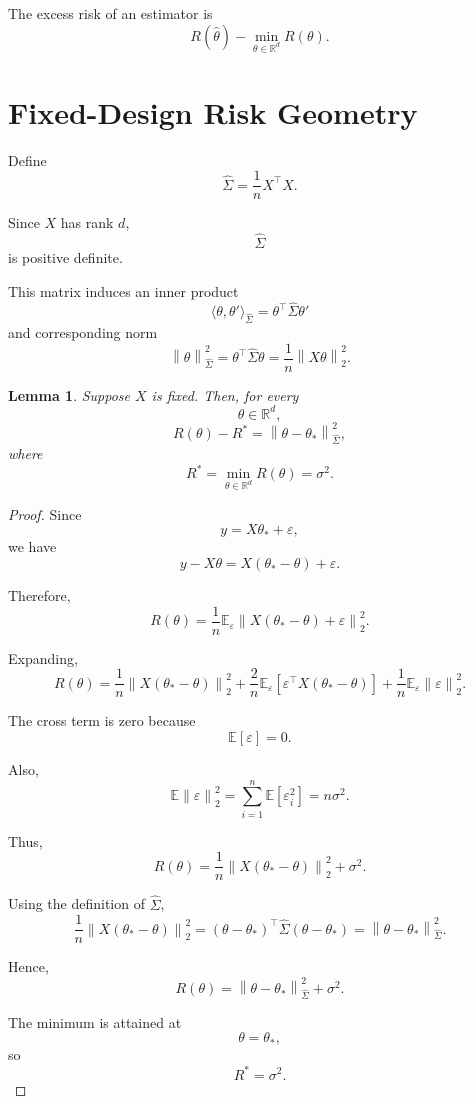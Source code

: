 \documentclass[12pt,oneside]{book}
\numberwithin{equation}{section}
\theoremstyle{definition}
\theoremstyle{plain}
\newtheorem{lemma}{Lemma}[section]
\theoremstyle{remark}
\newcommand{\R}{\mathbb{R}}
\newcommand{\E}{\mathbb{E}}
\newcommand{\norm}[1]{\left\lVert #1 \right\rVert}
\begin{document}
The excess risk of an estimator is
\[
R(\widehat{\theta})-\min_{\theta\in\R^d}R(\theta).
\]

\section{Fixed-Design Risk Geometry}

Define
\[
\widehat{\Sigma}
=
\frac{1}{n}X^\top X.
\]

Since $X$ has rank $d$,
\[
\widehat{\Sigma}
\]
is positive definite.

This matrix induces an inner product
\[
\langle \theta,\theta'\rangle_{\widehat{\Sigma}}
=
\theta^\top\widehat{\Sigma}\theta'
\]
and corresponding norm
\[
\norm{\theta}_{\widehat{\Sigma}}^2
=
\theta^\top\widehat{\Sigma}\theta
=
\frac{1}{n}\norm{X\theta}_2^2.
\]

\begin{lemma}
Suppose $X$ is fixed. Then, for every
\[
\theta\in\R^d,
\]
\[
R(\theta)-R^*
=
\norm{\theta-\theta_*}_{\widehat{\Sigma}}^2,
\]
where
\[
R^*
=
\min_{\theta\in\R^d}R(\theta)
=
\sigma^2.
\]
\end{lemma}

\begin{proof}
Since
\[
y=X\theta_*+\varepsilon,
\]
we have
\[
y-X\theta
=
X(\theta_*-\theta)+\varepsilon.
\]

Therefore,
\[
R(\theta)
=
\frac{1}{n}
\E_\varepsilon
\norm{X(\theta_*-\theta)+\varepsilon}_2^2.
\]

Expanding,
\[
R(\theta)
=
\frac{1}{n}\norm{X(\theta_*-\theta)}_2^2
+
\frac{2}{n}
\E_\varepsilon
\left[
\varepsilon^\top X(\theta_*-\theta)
\right]
+
\frac{1}{n}
\E_\varepsilon\norm{\varepsilon}_2^2.
\]

The cross term is zero because
\[
\E[\varepsilon]=0.
\]

Also,
\[
\E\norm{\varepsilon}_2^2
=
\sum_{i=1}^n \E[\varepsilon_i^2]
=
n\sigma^2.
\]

Thus,
\[
R(\theta)
=
\frac{1}{n}\norm{X(\theta_*-\theta)}_2^2
+
\sigma^2.
\]

Using the definition of $\widehat{\Sigma}$,
\[
\frac{1}{n}\norm{X(\theta_*-\theta)}_2^2
=
(\theta-\theta_*)^\top\widehat{\Sigma}(\theta-\theta_*)
=
\norm{\theta-\theta_*}_{\widehat{\Sigma}}^2.
\]

Hence,
\[
R(\theta)
=
\norm{\theta-\theta_*}_{\widehat{\Sigma}}^2+\sigma^2.
\]

The minimum is attained at
\[
\theta=\theta_*,
\]
so
\[
R^*=\sigma^2.
\]
\end{proof}
\end{document}
